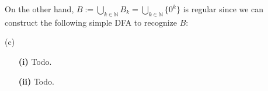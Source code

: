 On the other hand, \( B := \bigcup_{k \in \mathbb{N}} B_k = \bigcup_{k \in \mathbb{N}} \{0^k\} \) is regular since we can construct the following simple DFA to recognize \( B \):

\begin{center}
\end{center}

(c)

\begin{enumerate}
    \item[\textbf{(i)}] Todo.

    \item[\textbf{(ii)}] Todo.
\end{enumerate}



